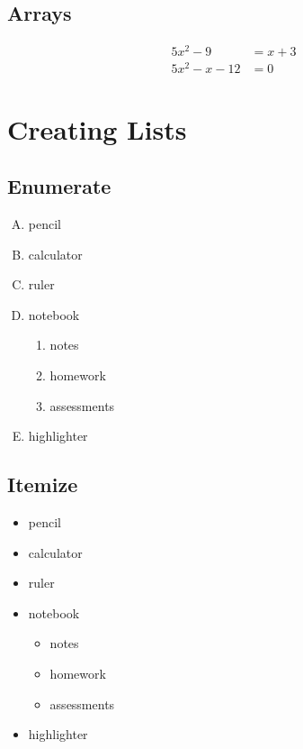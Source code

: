 \documentclass[11pt, a4paper]{article}
\begin{document}
\subsection{Arrays}
\begin{align}
       5x^2 - 9 &= x + 3\\
  5x^2 - x - 12 &= 0
\end{align}

\pagebreak

\section{Creating Lists}

\subsection{Enumerate}

\begin{enumerate}[A.]
\item pencil
\item calculator
\item ruler
\item notebook
  \begin{enumerate}
  \item notes
  \item homework
  \item assessments
  \end{enumerate}
\item highlighter
\end{enumerate}

\subsection{Itemize}

\begin{itemize}
\item pencil
\item calculator
\item ruler
\item notebook
  \begin{itemize}
  \item notes
  \item homework
  \item assessments
  \end{itemize}
\item highlighter
\end{itemize}

\pagebreak
\end{document}
